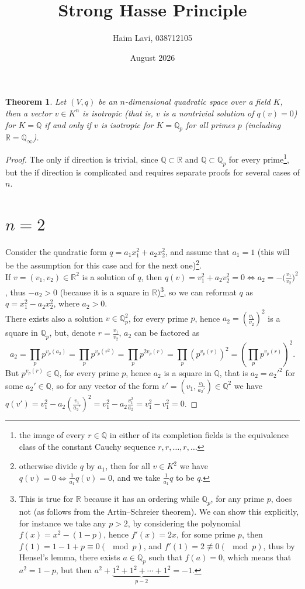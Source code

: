 \documentclass{article}
\title{Strong Hasse Principle}
\author{Haim Lavi, 038712105}
\date{August 2026}
\newtheorem{theorem}{Theorem}
\begin{document}
\maketitle

\begin{theorem}
Let $(V,q)$ be an $n$-dimensional quadratic space over a field $K$, then a vector $v\in{K}^n$ is isotropic (that is, $v$ is a nontrivial solution of $q(v)=0$) for $K=\mathbb{Q}$ if and only if $v$ is isotropic for $K=\mathbb{Q}_p$ for all primes $p$ (including $\mathbb{R}=\mathbb{Q}_\infty$).
\end{theorem}
\begin{proof}
The only if direction is trivial, since $\mathbb{Q}\subset\mathbb{R}$ and $\mathbb{Q}\subset\mathbb{Q}_p$ for every prime\footnote{the image of every $r\in\mathbb{Q}$ in either of its completion fields is the equivalence class of the constant Cauchy sequence $r,r,\dots,r,\dots$}, but the if direction is complicated and requires separate proofs for several cases of $n$.
\section*{$n=2$}
Consider the quadratic form $q=a_1x_1^2+a_2x_2^2$, and assume that $a_1=1$ (this will be the assumption for this case and for the next one)\footnote{otherwise divide $q$ by $a_1$, then for all $v\in{K}^2$ we have $q(v)=0\iff\frac{1}{a_1}q(v)=0$, and we take $\frac{1}{a_1}q$ to be $q$.}.\\
If $v=(v_1,v_2)\in\mathbb{R}^2$ is a solution of $q$, then $q(v)=v_1^2+a_2v_2^2=0\iff{a_2=-(\frac{v_1}{v_2}})^2$, thus $-a_2>0$ (because it is a square in $\mathbb{R}$)\footnote{This is true for $\mathbb{R}$ because it has an ordering while $\mathbb{Q}_p$, for any prime $p$, does not (as follows from the Artin–Schreier theorem).
We can show this explicitly, for instance we take any $p>2$, by considering the polynomial $f(x)=x^2-(1-p)$, hence $f'(x)=2x$, for some prime $p$, then $f(1)=1-1+p\equiv0(\mod{p})$, and $f'(1)=2\not\equiv0(\mod{p})$, thus by Hensel’s lemma, there exists $a\in\mathbb{Q}_p$ such that $f(a)=0$, which means that $a^2=1-p$, but then $a^2+\underset{p-2}{\underbrace{1^2+1^2+\cdots+1^2}}=-1$.
}, so we can reformat $q$ as $q=x_1^2-a_2x_2^2$, where $a_2>0$.\\
\newline
There exists also a solution $v\in\mathbb{Q}_p^2$, for every prime $p$, hence $a_2=(\frac{v_1}{v_2})^2$ is a square in $\mathbb{Q}_p$, but, denote $r=\frac{v_1}{v_2}$, $a_2$ can be factored as \[
a_2=\prod_pp^{v_p(a_2)}=\prod_pp^{v_p(r^2)}=\prod_pp^{2v_p(r)}=\prod_p\left(p^{v_p(r)}\right)^2=\left(\prod_pp^{v_p(r)}\right)^2.
\]
But $p^{v_p(r)}\in\mathbb{Q}$, for every prime $p$, hence $a_2$ is a square in $\mathbb{Q}$, that is $a_2=a_2'^2$ for some $a_2'\in\mathbb{Q}$, so for any vector of the form $v'=(v_1,\frac{v_1}{a_2'})\in\mathbb{Q}^2$ we have $q(v')=v_1^2-a_2(\frac{v_1}{a_2'})^2=v_1^2-a_2\frac{v_1^2}{a_2}=v_1^2-v_1^2=0$.

\end{proof}
\end{document}
